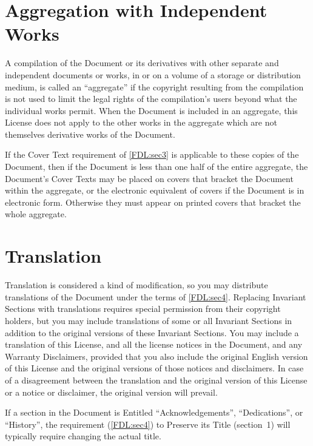 \documentclass[12pt,a4paper,openany]{book}
\begin{document}
\section{Aggregation with Independent Works}
\label{FDL:sec7}

A compilation of the Document or its derivatives with other separate and
independent documents or works, in or on a volume of a storage or
distribution medium, is called an “aggregate” if the copyright resulting
from the compilation is not used to limit the legal rights of the
compilation’s users beyond what the individual works permit.  When the
Document is included in an aggregate, this License does not apply to the
other works in the aggregate which are not themselves derivative works of
the Document.

If the Cover Text requirement of \autoref{FDL:sec3} is applicable to these
copies of the Document, then if the Document is less than one half of the
entire aggregate, the Document’s Cover Texts may be placed on covers that
bracket the Document within the aggregate, or the electronic equivalent of
covers if the Document is in electronic form.  Otherwise they must appear
on printed covers that bracket the whole aggregate.

\section{Translation}
\label{FDL:sec8}

Translation is considered a kind of modification, so you may distribute
translations of the Document under the terms of \autoref{FDL:sec4}.
Replacing Invariant Sections with translations requires special permission
from their copyright holders, but you may include translations of some or
all Invariant Sections in addition to the original versions of these
Invariant Sections.  You may include a translation of this License, and all
the license notices in the Document, and any Warranty Disclaimers,
provided that you also include the original English version of this License
and the original versions of those notices and disclaimers.  In case of a
disagreement between the translation and the original version of this
License or a notice or disclaimer, the original version will prevail.

If a section in the Document is Entitled “Acknowledgements”, “Dedications”,
or “History”, the requirement (\autoref{FDL:sec4}) to Preserve its Title
(section~1) will typically require changing the actual title.
\end{document}
